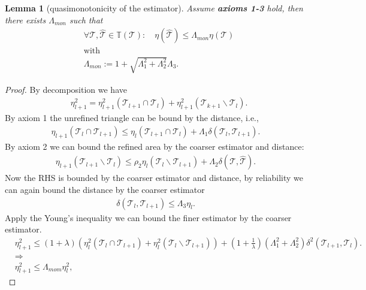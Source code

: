 \documentclass[a4paper,12pt,oneside,fleqn]{book}
\newtheorem{lemma}[theorem]{Lemma}
\theoremstyle{definition}
\theoremstyle{remark}
\begin{document}
\begin{lemma}[quasimonotonicity of the estimator]
	Assume \textbf{axioms 1-3} hold, then there exists $\Lambda_{mon}$ such that
\begin{equation}
\begin{aligned}
	& \forall \mathcal{T}, \hat{\mathcal{T}} \in \mathbb{T}(\mathcal{T}): \quad \eta(\hat{\mathcal{T}}) \le \Lambda_{mon} \eta(\mathcal{T})\\
	&\text{with}\\ 
	& \Lambda_{mon} := 1 + \sqrt{\Lambda_1^2 + \Lambda_2^2} \Lambda_3.
\end{aligned} 
\end{equation}
\end{lemma}
\begin{proof}
By decomposition we have
\begin{align*}
	& \eta_{l + 1}^2 = \eta_{l + 1}^2(\mathcal{T}_{l + 1} \cap \mathcal{T}_l) + \eta_{l +1}^2( \mathcal{T}_{k + 1} \backslash \mathcal{T}_l).
\end{align*}
By axiom 1 the unrefined triangle can be bound by the distance, i.e., 
\begin{align*}
	\eta_{l + 1} (\mathcal{T}_l \cap \mathcal{T}_{l + 1}) \le \eta_l(\mathcal{T}_{l + 1} \cap \mathcal{T}_l) + \Lambda_1 \delta(\mathcal{T}_l, \mathcal{T}_{l + 1}). 
\end{align*}
By axiom 2 we can bound the refined area by the coarser estimator and distance:
\begin{align*}
	\eta_{l + 1}(\mathcal{T}_{l + 1}\backslash \mathcal{T}_l) \le \rho_2 \eta_l(\mathcal{T}_l \backslash  \mathcal{T}_{l +1}) + \Lambda_2 \delta(\mathcal{T}, \hat{\mathcal{T}}). 
\end{align*}
Now the RHS is bounded by the coarser estimator and distance, by reliability we can again bound the distance by the coarser estimator
\begin{align*}
	\delta(\mathcal{T}_l, \mathcal{T}_{l + 1}) \le \Lambda_3 \eta_l.
\end{align*}
Apply the Young's inequality we can bound the finer estimator by the coarser estimator. 
\begin{align*}
	&\eta_{l + 1}^2 \le (1 + \lambda)(\eta_l^2(\mathcal{T}_l \cap \mathcal{T}_{l + 1}) + \eta_l^2(\mathcal{T}_l \backslash \mathcal{T}_{l + 1})) + (1 + \frac{1}{\lambda})(\Lambda_1^2 + \Lambda_2^2)\delta^2(\mathcal{T}_{l + 1}, \mathcal{T}_l). \\
	&\Rightarrow\\
	&\eta^2_{l + 1} \le \Lambda_{mom} \eta_l^2,
\end{align*}
\end{proof}
\end{document}

